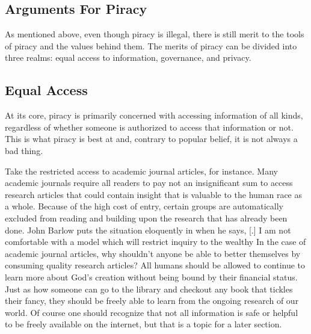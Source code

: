 \documentclass[onecolumn, 12pt]{article}
\begin{document}
\begin{refsection}
\section{Arguments For Piracy}
As mentioned above, even though piracy is illegal, there is still merit to the tools of
piracy and the values behind them. The merits of piracy can be divided into three realms:
equal access to information, governance, and privacy.

\subsection{Equal Access}
At its core, piracy is primarily concerned with accessing information of all kinds,
regardless of whether someone is authorized to access that information or not. This is
what piracy is best at and, contrary to popular belief, it is not always a bad thing.

Take the restricted access to academic journal articles, for instance. Many academic
journals require all readers to pay not an insignificant sum to access research articles
that could contain insight that is valuable to the human race as a whole. Because of the
high cost of entry, certain groups are automatically excluded from reading and building
upon the research that has already been done. John Barlow puts the situation eloquently in
 when he says, [.]{%
  I am not comfortable with a model which will restrict inquiry to the wealthy%
}
In the case of academic journal articles, why shouldn't anyone be able to better
themselves by consuming quality research articles? All humans should be allowed
to continue to learn more about God's creation without being bound by their
financial status. Just as how someone can go to the library and checkout any
book that tickles their fancy, they should be freely able to learn from the
ongoing research of our world. Of course one should recognize that not all
information is safe or helpful to be freely available on the internet, but that
is a topic for a later section.


\end{refsection}
\end{document}
